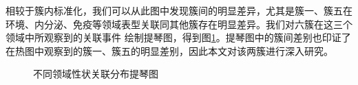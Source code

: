相较于簇内标准化，我们可以从此图中发现簇间的明显差异，尤其是簇一、簇五在环境、内分泌、免疫等领域表型关联同其他簇存在明显差异。我们对六簇在这三个领域中所观察到的关联事件
绘制提琴图，得到图\ref{fig:violine}。提琴图中的簇间差别也印证了在热图中观察到的簇一、簇五的明显差别，因此本文对该两簇进行深入研究。

\begin{figure}[htbp]
	\centering
	\caption{不同领域性状关联分布提琴图}
	\label{fig:violine}
	\end{figure}
	

